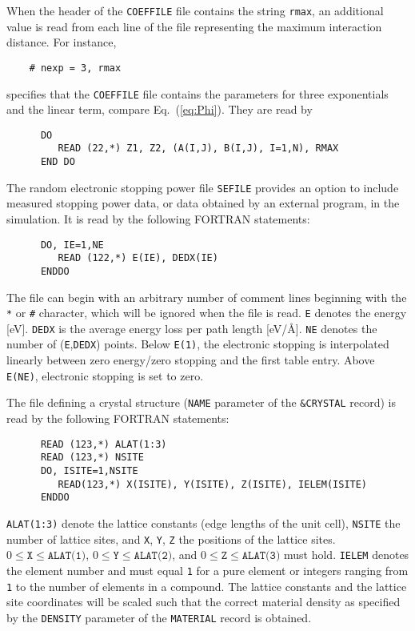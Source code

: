 When the header of the 
\texttt{COEFFILE} file contains the string \texttt{rmax}, an additional 
value is read from each line of the file representing the maximum interaction 
distance. For instance, 
%
\begin{verbatim}
    # nexp = 3, rmax
\end{verbatim}
%
specifies that the \texttt{COEFFILE} file contains the parameters for three 
exponentials and the linear term, compare Eq.~(\ref{eq:Phi}). They are read
by
%
\begin{verbatim}
      DO
         READ (22,*) Z1, Z2, (A(I,J), B(I,J), I=1,N), RMAX
      END DO 
\end{verbatim}

The random electronic stopping power file \texttt{SEFILE} provides an option to
include measured stopping power data, or data obtained by an external program,
in the simulation. It is read by the following FORTRAN statements:
%
\begin{verbatim}
      DO, IE=1,NE
         READ (122,*) E(IE), DEDX(IE)
      ENDDO
\end{verbatim}
%
The file can begin with an arbitrary number of comment lines beginning with the
\texttt{*} or \texttt{\#} character, which will be ignored when the file is 
read. \texttt{E} denotes the energy [eV]. \texttt{DEDX} is the average energy 
loss per path length [eV/\AA]. \texttt{NE} denotes the number of 
(\texttt{E},\texttt{DEDX}) points. Below \texttt{E(1)}, the electronic stopping 
is interpolated linearly between zero energy/zero stopping and the first table
entry. Above \texttt{E(NE)}, electronic stopping is set to zero.

The file defining a crystal structure (\texttt{NAME} parameter of the
\texttt{\&CRYSTAL} record) is read by the following FORTRAN statements:
%
\begin{verbatim}
      READ (123,*) ALAT(1:3)
      READ (123,*) NSITE
      DO, ISITE=1,NSITE
         READ(123,*) X(ISITE), Y(ISITE), Z(ISITE), IELEM(ISITE)
      ENDDO
\end{verbatim}
%
\texttt{ALAT(1:3)} denote the lattice constants (edge lengths of the unit
cell), \texttt{NSITE} the number of lattice sites, and \texttt{X}, \texttt{Y},
\texttt{Z} the positions of the lattice sites. $0 \le \texttt{X} \le
\texttt{ALAT(1)}$, $0 \le \texttt{Y} \le \texttt{ALAT(2)}$, and $0 \le
\texttt{Z} \le \texttt{ALAT(3)}$ must hold.  \texttt{IELEM} denotes the element
number and must equal \texttt{1} for a pure  element or integers ranging from
\texttt{1} to the number of elements in a  compound. The lattice constants and
the lattice site coordinates  will be scaled such that the correct material
density as specified by the \texttt{DENSITY} parameter of the \texttt{MATERIAL}
record is obtained.

